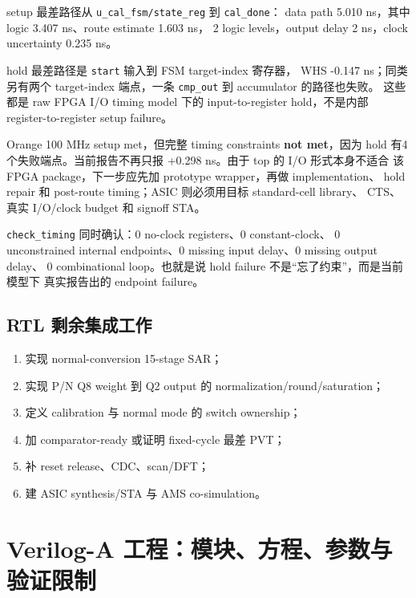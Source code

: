 \documentclass[UTF8,11pt,a4paper]{ctexart}
\newcommand{\code}[1]{\texttt{\small #1}}
\begin{document}
setup 最差路径从 \code{u\_cal\_fsm/state\_reg} 到 \code{cal\_done}：
data path 5.010 ns，其中 logic 3.407 ns、route estimate 1.603 ns，
2 logic levels，output delay 2 ns，clock uncertainty 0.235 ns。

hold 最差路径是 \code{start} 输入到 FSM target-index 寄存器，
WHS -0.147 ns；同类另有两个 target-index 端点，一条
\code{cmp\_out} 到 accumulator 的路径也失败。
这些都是 raw FPGA I/O timing model 下的 input-to-register hold，不是内部
register-to-register setup failure。

\begin{verdictbox}[title=\textbf{时序结论必须这样表述}]{Orange}
  100 MHz setup met，但完整 timing constraints \textbf{not met}，因为 hold
  有4个失败端点。当前报告不再只报 +0.298 ns。由于 top 的 I/O 形式本身不适合
  该 FPGA package，下一步应先加 prototype wrapper，再做 implementation、
  hold repair 和 post-route timing；ASIC 则必须用目标 standard-cell library、
  CTS、真实 I/O/clock budget 和 signoff STA。
\end{verdictbox}

\code{check\_timing} 同时确认：0 no-clock registers、0 constant-clock、
0 unconstrained internal endpoints、0 missing input delay、0 missing output delay、
0 combinational loop。也就是说 hold failure 不是“忘了约束”，而是当前模型下
真实报告出的 endpoint failure。

\subsection{RTL 剩余集成工作}

\begin{enumerate}
  \item 实现 normal-conversion 15-stage SAR；
  \item 实现 P/N Q8 weight 到 Q2 output 的 normalization/round/saturation；
  \item 定义 calibration 与 normal mode 的 switch ownership；
  \item 加 comparator-ready 或证明 fixed-cycle 最差 PVT；
  \item 补 reset release、CDC、scan/DFT；
  \item 建 ASIC synthesis/STA 与 AMS co-simulation。
\end{enumerate}

\section[Verilog-A 工程]{Verilog-A 工程：模块、方程、参数与验证限制}
\end{document}
